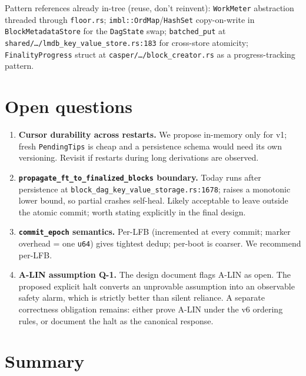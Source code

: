 \documentclass[11pt]{article}
\newcommand{\code}[1]{\texttt{#1}}
\begin{document}
Pattern references already in-tree (reuse, don't reinvent):
\code{WorkMeter} abstraction threaded through \code{floor.rs};
\code{imbl::OrdMap}/\code{HashSet} copy-on-write in
\code{BlockMetadataStore} for the \code{DagState} swap;
\code{batched\_put} at
\code{shared/\ldots/lmdb\_key\_value\_store.rs:183} for cross-store
atomicity; \code{FinalityProgress} struct at
\code{casper/\ldots/block\_creator.rs} as a progress-tracking pattern.

\section{Open questions}

\begin{enumerate}[label=\textbf{Q\arabic*.}, leftmargin=2em]
\item \textbf{Cursor durability across restarts.} We propose
in-memory only for v1; fresh \code{PendingTips} is cheap and a
persistence schema would need its own versioning. Revisit if restarts
during long derivations are observed.

\item \textbf{\code{propagate\_ft\_to\_finalized\_blocks} boundary.}
Today runs after persistence at
\code{block\_dag\_key\_value\_storage.rs:1678}; raises a monotonic lower
bound, so partial crashes self-heal. Likely acceptable to leave outside
the atomic commit; worth stating explicitly in the final design.

\item \textbf{\code{commit\_epoch} semantics.} Per-LFB (incremented at
every commit; marker overhead = one \code{u64}) gives tightest dedup;
per-boot is coarser. We recommend per-LFB.

\item \textbf{A-LIN assumption Q-1.} The design document flags A-LIN as
open. The proposed explicit halt converts an unprovable assumption into
an observable safety alarm, which is strictly better than silent
reliance. A separate correctness obligation remains: either prove A-LIN
under the v6 ordering rules, or document the halt as the canonical
response.
\end{enumerate}

\section*{Summary}
\end{document}
